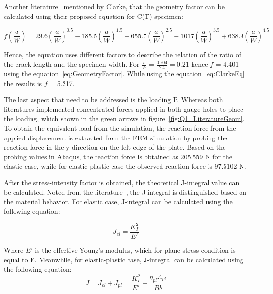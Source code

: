 \documentclass[12pt]{article}
\begin{document}
Another literature~\cite{Clarke.1979} mentioned by Clarke, that the geometry factor can be calculated using their proposed equation for
C(T) specimen:

\begin{equation}
  f\!\left(\frac{a}{W}\right) = 29.6(\frac{a}{W})^{0.5} - 185.5(\frac{a}{W})^{1.5} + 655.7(\frac{a}{W})^{2.5} - 1017(\frac{a}{W})^{3.5} + 638.9(\frac{a}{W})^{4.5} 
  \label{eq:ClarkeEq}
\end{equation}

\hspace{1em}Hence, the equation uses different factors to describe the relation of the ratio of the crack length and the 
specimen width. For $\frac{a}{W} = \frac{0.504}{2.4} = 0.21$ hence $f$\cite{Zhu.2012} = 4.401 using the equation~\ref{eq:GeometryFactor}. While using the equation~\ref{eq:ClarkeEq}
the results is $f$\cite{Clarke.1979} = 5.217. 

\hspace{1em}The last aspect that need to be addressed is the loading P. Whereas both literatures implemented concentrated forces applied in both gauge holes to place the loading, which shown in the green arrows in figure~\ref{fig:Q1_LiteratureGeom}. 
To obtain the equivalent load from the simulation,
the reaction force from the applied displacement is extracted from the FEM simulation by probing the reaction force in the y-direction
on the left edge of the plate. Based on the probing values in Abaqus, the reaction force is obtained as 205.559 N for the elastic case, while 
for elastic-plastic case the observed reaction force is 97.5102 N.

\hspace{1em}After the stress-intensity factor is obtained, the theoretical J-integral value can be calculated. Noted from the literature~\cite{Zhu.2012}, the J integral
is distinguished based on the material behavior. For elastic case, J-integral can be calculated using the following equation:

\begin{equation}
    J_{el} = \frac{K_I^2}{E'}
    \label{eq:JIntegralElastic}
\end{equation}

Where $E'$ is the effective Young's modulus, which for plane stress condition is equal to E. Meanwhile, for elastic-plastic case, J-integral can be calculated using the following equation:
\begin{equation}
    J = J_{el} + J_{pl} = \frac{K_I^2}{E'} + \frac{\eta_{pl}A_{pl}}{Bb} 
    \label{eq:JIntegralElasticPlastic}
\end{equation}
\end{document}
